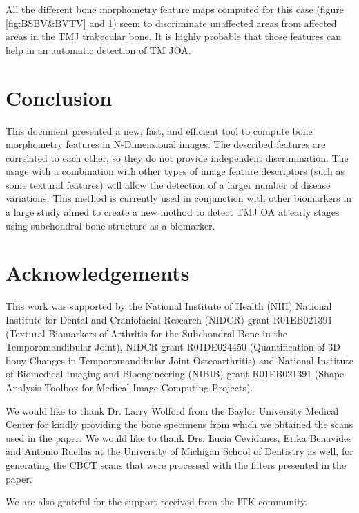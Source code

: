 \documentclass{InsightArticle}
\begin{document}
\begin{figure}[H]
\begin{center}
    \label{fig:TbN/TbSp/TbTh}
  \end{center}
\end{figure}

All the different bone morphometry feature maps computed for this case (figure \ref{fig:BSBV&BVTV} and \ref{fig:TbN/TbSp/TbTh}) seem to discriminate unaffected areas from affected areas in the TMJ trabecular bone. It is highly probable that those features can help in an automatic detection of TM JOA.

\newpage
\section{Conclusion}
\label{sec:conclusions}

This document presented a new, fast, and efficient tool to compute bone morphometry features in N-Dimensional images. The described features are correlated to each other, so they do not provide independent discrimination. The usage with a combination with other types of image feature descriptors (such as some textural features\cite{textureFeat1}) will allow the detection of a larger number of disease variations. This method is currently used in conjunction with other biomarkers in a large study aimed to create a new method to detect TMJ OA at early stages using subchondral bone structure as a biomarker.

\section*{Acknowledgements}

This work was supported by the National Institute of Health (NIH) National Institute for Dental and Craniofacial Research (NIDCR) grant R01EB021391 (Textural Biomarkers of Arthritis for the Subchondral Bone in the Temporomandibular Joint), NIDCR grant R01DE024450  (Quantification of 3D bony Changes in Temporomandibular Joint Osteoarthritis) and National Institute of Biomedical Imaging and Bioengineering (NIBIB) grant R01EB021391 (Shape Analysis Toolbox for Medical Image Computing Projects). 

We would like to thank Dr. Larry Wolford from the Baylor University Medical Center for kindly providing the bone specimens from which we obtained the scans used in the paper. We would like to thank Drs. Lucia Cevidanes, Erika Benavides and Antonio Ruellas at the University of Michigan School of Dentistry as well, for generating the CBCT scans that were processed with the filters presented in the paper.

We are also grateful for the support received from the ITK community.

%
%


\end{document}
